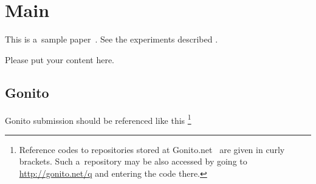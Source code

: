
\section{Main}

This is a~sample paper~\cite{gonito2016}.
See the experiments described .

Please put your content here.



\subsection{Gonito}

Gonito submission should be referenced like this
%
\footnote{Reference codes to repositories stored at
Gonito.net~\cite{gonito2016} are given in curly brackets. Such a~repository may be also accessed by going
to \url{http://gonito.net/q} and entering the code there.}
